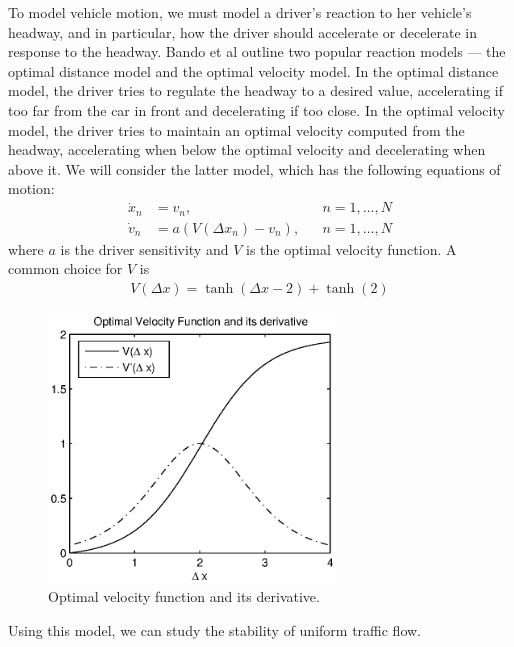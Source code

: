 \documentclass[10pt,twocolumn]{article}
\newcommand{\lm}{\fontfamily{\sfdefault}\selectfont}
\begin{document}
To model vehicle motion, we must model a driver's reaction to her vehicle's headway, and in particular, how the driver should accelerate or decelerate in response to the headway. Bando et al \cite{Bando} outline two popular reaction models --- the optimal distance model and the optimal velocity model. In the optimal distance model, the driver tries to regulate the headway to a desired value, accelerating if too far from the car in front and decelerating if too close. In the optimal velocity model, the driver tries to maintain an optimal velocity computed from the headway, accelerating when below the optimal velocity and decelerating when above it. We will consider the latter model, which has the following equations of motion:
\begin{align}
\label{ovm1} \dot{x}_n &= v_n,& &n=1,\dots,N\\
\label{ovm2} \dot{v}_n &= a\left(V(\Delta x_n) - v_n\right),& &n=1,\dots,N
\end{align}
where $a$ is the driver sensitivity and $V$ is the optimal velocity function. A common choice for $V$ \cite{Bando} is
\begin{gather*}
V(\Delta x)=\tanh(\Delta x - 2) + \tanh(2)
\end{gather*}

\begin{figure}[!h]
\lm
\begin{center}
\includegraphics[width=3in]{vopt}
\end{center}
\caption{\label{fig:vopt} Optimal velocity function and its derivative.}
\end{figure}

Using this model, we can study the stability of uniform traffic flow.
\end{document}
